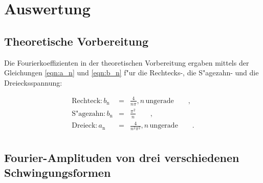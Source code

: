 \section{Auswertung}
\label{sec:auswertung}

\subsection{Theoretische Vorbereitung} %
\label{sub:theoretische_vorbereitung}

Die Fourierkoeffizienten in der theoretischen Vorbereitung ergaben mittels der Gleichungen \eqref{eqn:a_n} und \eqref{eqn:b_n} f"ur die Rechtecks-, die S"agezahn- und die Dreiecksspannung:

\begin{eqnarray*}
\text{Rechteck}: b_\mathrm{n} &=& \frac{4}{n \pi}, n \, \text{ungerade} \qquad ,\\
\text{S"agezahn}: b_\mathrm{n} &=& \frac{\pi^2}{n}  \qquad ,\\
\text{Dreieck}: a_\mathrm{n} &=& \frac{4}{n^2 \pi^2}, n \,\text{ungerade} \qquad .\\
\end{eqnarray*}

\clearpage

\subsection{Fourier-Amplituden von drei verschiedenen Schwingungsformen} %
\label{sub:fourier_amplituden_von_drei_verschiedenen_}

